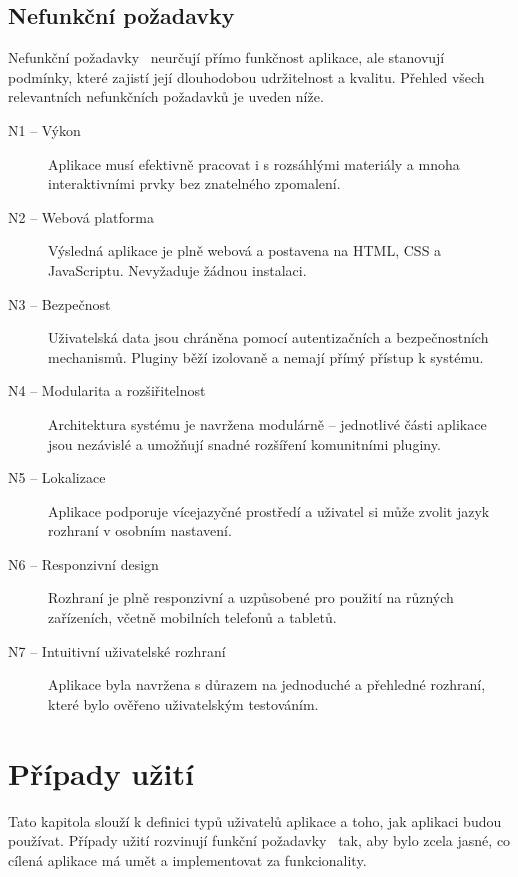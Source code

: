 \subsection{Nefunkční požadavky}
Nefunkční požadavky~\cite{uml_2007} neurčují přímo funkčnost aplikace, ale stanovují podmínky, které zajistí její dlouhodobou udržitelnost a kvalitu. Přehled všech relevantních nefunkčních požadavků je uveden níže.


\begin{description}
    \item[N1 -- Výkon]
    Aplikace musí efektivně pracovat i s rozsáhlými materiály a mnoha interaktivními prvky bez znatelného zpomalení.

    \item[N2 -- Webová platforma]
    Výsledná aplikace je plně webová a postavena na HTML, CSS a JavaScriptu. Nevyžaduje žádnou instalaci.

    \item[N3 -- Bezpečnost]
    Uživatelská data jsou chráněna pomocí autentizačních a bezpečnostních mechanismů. Pluginy běží izolovaně a nemají přímý přístup k systému.

    \item[N4 -- Modularita a rozšiřitelnost]
    Architektura systému je navržena modulárně -- jednotlivé části aplikace jsou nezávislé a umožňují snadné rozšíření komunitními pluginy.

    \item[N5 -- Lokalizace]
    Aplikace podporuje vícejazyčné prostředí a uživatel si může zvolit jazyk rozhraní v osobním nastavení.

    \item[N6 -- Responzivní design]
    Rozhraní je plně responzivní a uzpůsobené pro použití na různých zařízeních, včetně mobilních telefonů a tabletů.

    \item[N7 -- Intuitivní uživatelské rozhraní]
    Aplikace byla navržena s důrazem na jednoduché a přehledné rozhraní, které bylo ověřeno uživatelským testováním.

\end{description}


\section{Případy užití}\label{chapter:analyza/uzivatelskePripady}

Tato kapitola slouží k definici typů uživatelů aplikace a toho, jak aplikaci budou používat.
Případy užití rozvinují funkční požadavky~\cite{uml_2007} tak, aby bylo zcela jasné, co cílená aplikace má umět a implementovat za funkcionality.

